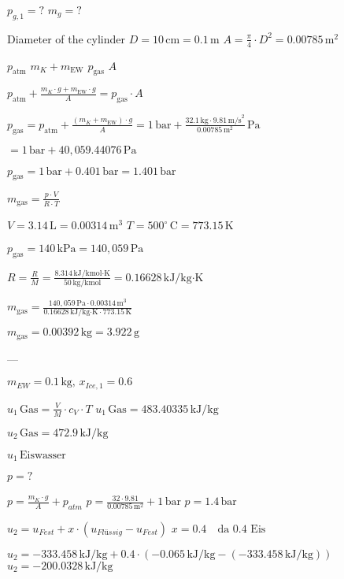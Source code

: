 \( p_{g,1} = ? \)  
\( m_g = ? \)  

Diameter of the cylinder \( D = 10 \, \text{cm} = 0.1 \, \text{m} \)  
\( A = \frac{\pi}{4} \cdot D^2 = 0.00785 \, \text{m}^2 \)  

\( p_{\text{atm}} \)  
\( m_K + m_{\text{EW}} \)  
\( p_{\text{gas}} \)  
\( A \)  

\( p_{\text{atm}} + \frac{m_K \cdot g + m_{\text{EW}} \cdot g}{A} = p_{\text{gas}} \cdot A \)  

\( p_{\text{gas}} = p_{\text{atm}} + \frac{(m_K + m_{\text{EW}}) \cdot g}{A} = 1 \, \text{bar} + \frac{32.1 \, \text{kg} \cdot 9.81 \, \text{m/s}^2}{0.00785 \, \text{m}^2} \, \text{Pa} \)  

\( = 1 \, \text{bar} + 40,059.44076 \, \text{Pa} \)  

\( p_{\text{gas}} = 1 \, \text{bar} + 0.401 \, \text{bar} = 1.401 \, \text{bar} \)  

\( m_{\text{gas}} = \frac{p \cdot V}{R \cdot T} \)  

\( V = 3.14 \, \text{L} = 0.00314 \, \text{m}^3 \)  
\( T = 500^\circ \, \text{C} = 773.15 \, \text{K} \)  

\( p_{\text{gas}} = 140 \, \text{kPa} = 140,059 \, \text{Pa} \)  

\( R = \frac{R}{M} = \frac{8.314 \, \text{kJ/kmol·K}}{50 \, \text{kg/kmol}} = 0.16628 \, \text{kJ/kg·K} \)  

\( m_{\text{gas}} = \frac{140,059 \, \text{Pa} \cdot 0.00314 \, \text{m}^3}{0.16628 \, \text{kJ/kg·K} \cdot 773.15 \, \text{K}} \)  

\( m_{\text{gas}} = 0.00392 \, \text{kg} = 3.922 \, \text{g} \)  

---

\( m_{EW} = 0.1 \, \text{kg}, \, x_{Ice,1} = 0.6 \)  

\( u_1 \, \text{Gas} = \frac{V}{M} \cdot c_V \cdot T \)  
\( u_1 \, \text{Gas} = 483.40335 \, \text{kJ/kg} \)  

\( u_2 \, \text{Gas} = 472.9 \, \text{kJ/kg} \)  

\( u_1 \, \text{Eiswasser} \)  

\( p = ? \)  

\( p = \frac{m_K \cdot g}{A} + p_{atm} \)  
\( p = \frac{32 \cdot 9.81}{0.00785 \, \text{m}^2} + 1 \, \text{bar} \)  
\( p = 1.4 \, \text{bar} \)  

\( u_2 = u_{Fest} + x \cdot (u_{Flüssig} - u_{Fest}) \)  
\( x = 0.4 \quad \text{da 0.4 Eis} \)  

\( u_2 = -333.458 \, \text{kJ/kg} + 0.4 \cdot (-0.065 \, \text{kJ/kg} - (-333.458 \, \text{kJ/kg})) \)  
\( u_2 = -200.0328 \, \text{kJ/kg} \)  

